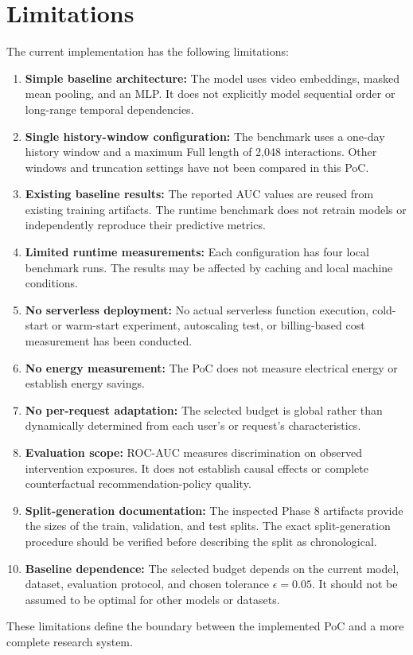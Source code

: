 \documentclass[11pt,a4paper]{article}
\begin{document}
\section{Limitations}
The current implementation has the following limitations:
\begin{enumerate}
    \item \textbf{Simple baseline architecture:} The model uses video embeddings, masked mean pooling, and an MLP. It does not explicitly model sequential order or long-range temporal dependencies.
    \item \textbf{Single history-window configuration:} The benchmark uses a one-day history window and a maximum Full length of 2,048 interactions. Other windows and truncation settings have not been compared in this PoC.
    \item \textbf{Existing baseline results:} The reported AUC values are reused from existing training artifacts. The runtime benchmark does not retrain models or independently reproduce their predictive metrics.
    \item \textbf{Limited runtime measurements:} Each configuration has four local benchmark runs. The results may be affected by caching and local machine conditions.
    \item \textbf{No serverless deployment:} No actual serverless function execution, cold-start or warm-start experiment, autoscaling test, or billing-based cost measurement has been conducted.
    \item \textbf{No energy measurement:} The PoC does not measure electrical energy or establish energy savings.
    \item \textbf{No per-request adaptation:} The selected budget is global rather than dynamically determined from each user's or request's characteristics.
    \item \textbf{Evaluation scope:} ROC-AUC measures discrimination on observed intervention exposures. It does not establish causal effects or complete counterfactual recommendation-policy quality.
    \item \textbf{Split-generation documentation:} The inspected Phase 8 artifacts provide the sizes of the train, validation, and test splits. The exact split-generation procedure should be verified before describing the split as chronological.
    \item \textbf{Baseline dependence:} The selected budget depends on the current model, dataset, evaluation protocol, and chosen tolerance $\epsilon = 0.05$. It should not be assumed to be optimal for other models or datasets.
\end{enumerate}
These limitations define the boundary between the implemented PoC and a more complete research system.
\end{document}
